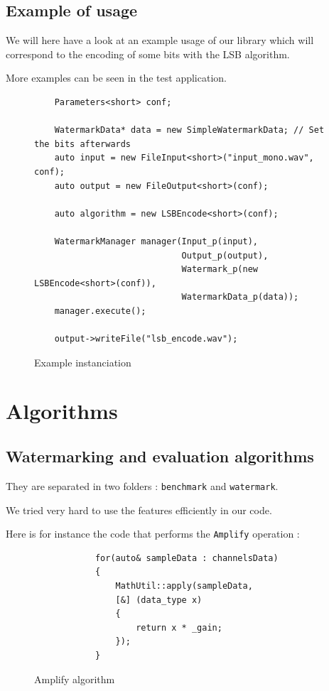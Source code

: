 \newpage

\subsection{Example of usage}
We will here have a look at an example usage of our library which will correspond to the encoding of some bits with the \ac{LSB} algorithm.

More examples can be seen in the test application.

\begin{figure}[h!]
\centering

\begin{lstlisting}
    Parameters<short> conf;
    
    WatermarkData* data = new SimpleWatermarkData; // Set the bits afterwards 
    auto input = new FileInput<short>("input_mono.wav", conf);
    auto output = new FileOutput<short>(conf);

    auto algorithm = new LSBEncode<short>(conf);

    WatermarkManager manager(Input_p(input),
    						 Output_p(output),
    						 Watermark_p(new LSBEncode<short>(conf)),
    						 WatermarkData_p(data));
    manager.execute();

    output->writeFile("lsb_encode.wav");
\end{lstlisting}

\caption{Example instanciation}
\end{figure}

\newpage

\section{Algorithms}
\subsection{Watermarking and evaluation algorithms}
They are separated in two folders : \texttt{benchmark} and \texttt{watermark}.

We tried very hard to use the  features efficiently in our code.

Here is for instance the code that performs the \texttt{Amplify} operation : 

\begin{figure}[ht!]
\centering
\begin{lstlisting}
			for(auto& sampleData : channelsData)
			{
				MathUtil::apply(sampleData,
				[&] (data_type x)
				{
					return x * _gain;
				});
			}
\end{lstlisting}
\caption{Amplify algorithm}
\label{amplify}
\end{figure}

